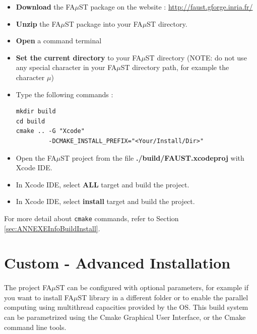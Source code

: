 \begin{itemize}
\item \textbf{Download} the FA$\mu$ST package on the website :  \url{http://faust.gforge.inria.fr/}
\item \textbf{Unzip} the FA$\mu$ST package into your FA$\mu$ST directory.
\item \textbf{Open} a command terminal
\item \textbf{Set the current directory} to your FA$\mu$ST directory (NOTE: do not use any special character in your FA$\mu$ST directory path, for example the character $\mu$)
\item Type the following commands : 
\begin{lstlisting}
mkdir build
cd build
cmake .. -G "Xcode" 
		 -DCMAKE_INSTALL_PREFIX="<Your/Install/Dir>"
\end{lstlisting}

\item Open the FA$\mu$ST project from the file \textbf{./build/FAUST.xcodeproj} with Xcode IDE. 
\item In Xcode IDE, select \textbf{ALL} target and build the project. 
\item In Xcode IDE, select \textbf{install} target and build the project. 
\end{itemize}

For more detail about \texttt{cmake} commands, refer to Section \ref{sec:ANNEXEInfoBuildInstall}.



\section{Custom - Advanced Installation}\label{sec:UnixCustomInstall}

\paragraph{}The project FA$\mu$ST can be configured with optional parameters, for example if you want to install FA$\mu$ST library in a different folder or to enable the parallel computing using multithread capacities provided by the OS. This build system can be parametrized using the Cmake Graphical User Interface, or the Cmake command line tools. 

